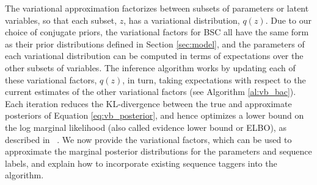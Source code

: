 The variational approximation factorizes between subsets of parameters or latent variables, so that each subset, $z$, has a variational distribution, $q(z)$. 
Due to our choice of conjugate priors, the variational factors for BSC all have
the same form as their prior distributions defined in Section \ref{sec:model},
and the parameters of each variational distribution can be computed in terms  of 
expectations over the other subsets of variables.
The inference algorithm works by updating each of these variational factors, $q(z)$, 
in turn,
taking expectations with respect to the current estimates of the other variational factors
(see Algorithm \ref{al:vb_bac}).
Each iteration reduces the KL-divergence between the true and approximate posteriors
of Equation \ref{eq:vb_posterior}, and hence optimizes a lower bound on the 
log marginal likelihood (also called evidence lower bound or ELBO), as described in
~\cite{bishop_pattern_2007,attias_advances_2000}.
We now provide the variational factors,
which can be used to approximate the marginal posterior distributions for the parameters and sequence
labels,
and explain how to incorporate existing sequence taggers into the algorithm.
